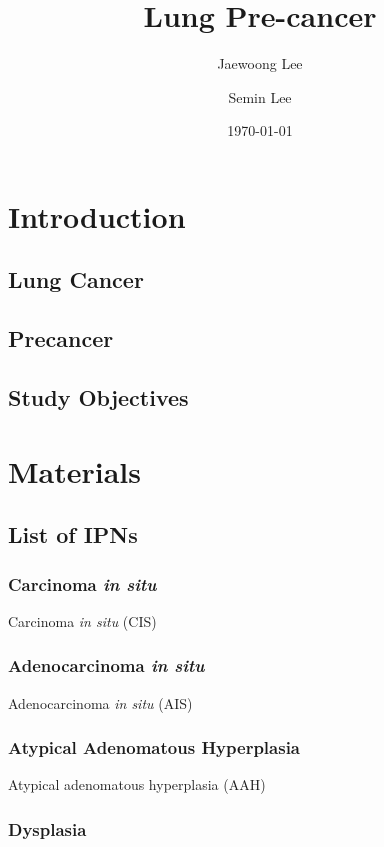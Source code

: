 \documentclass[a4paper]{article}
\title{Lung Pre-cancer}
\author{
    Jaewoong Lee
    \and
    Semin Lee
}
\date{\today}
\begin{document}
    \maketitle
    \newpage

    \tableofcontents
    \listoftables
    \listoffigures
    \newpage

    \section{Introduction}
        \subsection{Lung Cancer}

        \subsection{Precancer}

        \subsection{Study Objectives}

    \section{Materials}
        \subsection{List of IPNs}
            \subsubsection{Carcinoma \textit{in situ}}
                Carcinoma \textit{in situ} (CIS)

            \subsubsection{Adenocarcinoma \textit{in situ}}
                Adenocarcinoma \textit{in situ} (AIS)

            \subsubsection{Atypical Adenomatous Hyperplasia}
                Atypical adenomatous hyperplasia (AAH)

            \subsubsection{Dysplasia}
\end{document}
